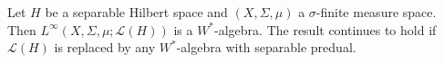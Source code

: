 Let $H$ be a separable Hilbert space and $(X, \Sigma, \mu)$ a $\sigma$-finite measure space. Then $L^\infty(X, \Sigma, \mu; \mathcal{L}(H))$ is a $W^*$-algebra. The result continues to hold if $\mathcal{L}(H)$ is replaced by any $W^*$-algebra with separable predual.
